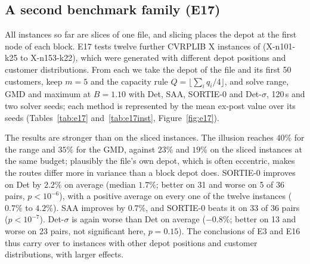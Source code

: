 \documentclass[11pt]{article}
\begin{document}
\begin{table}[t]\centering\small
\caption{E16: risk-adjusted deterministic (Det-$\sigma$) and normal-marginal
(PBOI-N) objectives, E3 grid, $B=1.10$ (format as Table~\ref{tab:e3}; the
variance is omitted for PBOI-N because the expected empirical variance does
not depend on the marginal family).}\label{tab:e16}

\end{table}

\subsection{A second benchmark family (E17)}\label{sec:e17}
All instances so far are slices of one file, and slicing places the depot at
the first node of each block. E17 tests twelve further CVRPLIB X instances of
\citet{uchoa2017new} (X-n101-k25 to X-n153-k22), which were generated with
different depot positions and customer distributions. From each we take the depot of the file and its
first 50 customers, keep $m=5$ and the capacity rule $Q=\lfloor\sum_iq_i/4\rfloor$,
and solve range, GMD and maximum at $B=1.10$ with Det, SAA, SORTIE-0 and
Det-$\sigma$, 120\,s and two solver seeds; each method is represented by the
mean ex-post value over its seeds (Tables~\ref{tab:e17}
and~\ref{tab:e17inst}, Figure~\ref{fig:e17}).

The results are stronger than on the sliced instances. The illusion reaches
$40\%$ for the range and $35\%$ for the GMD, against $23\%$ and $19\%$ on the
sliced instances at the same budget; plausibly the file's own depot, which is often eccentric,
makes the routes differ more in variance than a block depot does. SORTIE-0 improves on Det by $2.2\%$ on average
(median $1.7\%$; better on 31 and worse on 5 of 36 pairs, $p<10^{-6}$), with a
positive average on every one of the twelve instances ($0.7\%$ to $4.2\%$).
SAA improves by $0.7\%$, and SORTIE-0 beats it on 33 of 36 pairs
($p<10^{-7}$). Det-$\sigma$ is again worse than Det on average ($-0.8\%$; better on 13 and
worse on 23 pairs, not significant here, $p=0.15$). The
conclusions of E3 and E16 thus carry over to instances with other depot
positions and customer distributions, with larger effects.

\begin{table}[t]\centering\small
\caption{E17: second benchmark family (12 X instances, depot plus first 50
customers), $B=1.10$, 120\,s, mean of two solver seeds; improvement of the
ex-post value over Det (format as Table~\ref{tab:e3}).}\label{tab:e17}

\end{table}
\end{document}
